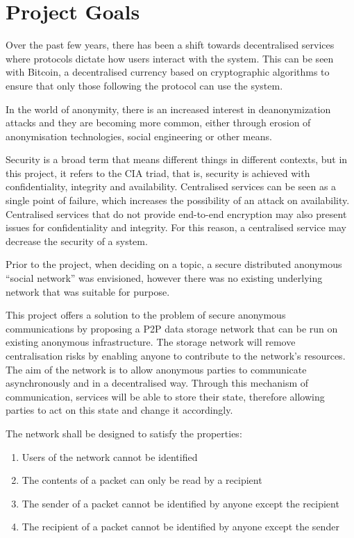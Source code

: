 \section{Project Goals}
	Over the past few years, there has been a shift towards decentralised services where protocols dictate how users interact with the system. This can be seen with Bitcoin, a decentralised currency based on cryptographic algorithms  to ensure that only those following the protocol can use the system.
	
	
	In the world of anonymity, there is an increased interest in deanonymization attacks and they are becoming more common, either through erosion of anonymisation technologies, social engineering or other means.
	
	Security is a broad term that means different things in different contexts, but in this project, it refers to the CIA triad, that is, security is achieved with confidentiality, integrity and availability. Centralised services can be seen as a single point of failure, which increases the possibility of an attack on availability. Centralised services that do not provide end-to-end encryption may also present issues for confidentiality and integrity. For this reason, a centralised service may decrease the security of a system.
	
	Prior to the project, when deciding on a topic, a secure distributed anonymous ``social network'' was envisioned, however there was no existing underlying network that was suitable for purpose.
	
	This project offers a solution to the problem of secure anonymous communications by proposing a P2P data storage network that can be run on existing anonymous infrastructure. The storage network will remove centralisation risks by enabling anyone to contribute to the network's resources. The aim of the network is to allow anonymous parties to communicate asynchronously and in a decentralised way. Through this mechanism of communication, services will be able to store their state, therefore allowing parties to act on this state and change it accordingly.
	
	The network shall be designed to satisfy the properties:
	\begin{enumerate}
		\item Users of the network cannot be identified
		\item The contents of a packet can only be read by a recipient
		\item The sender of a packet cannot be identified by anyone except the recipient
		\item The recipient of a packet cannot be identified by anyone except the sender
	\end{enumerate}
	
